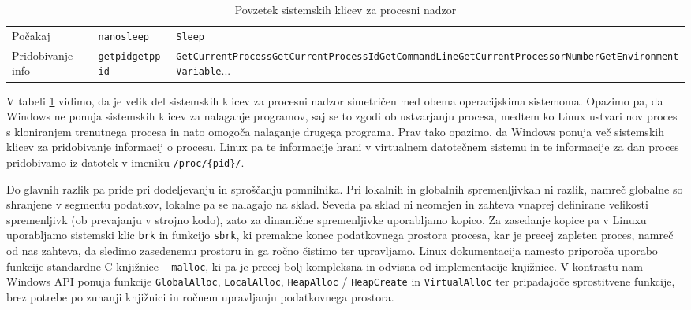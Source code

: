 \documentclass[a4paper,12pt,openright]{book}
\begin{document}
\begin{table}[h!]
\begin{center}
\begin{tabular}{ p{3.7cm}|p{2.5cm}|p{6cm} }
			Počakaj          & \verb|nanosleep|                                       & \verb|Sleep|                                                                                                                                                                    \\
			Pridobivanje info & \verb|getpid|\newline\verb|getppid|                    & \verb|GetCurrentProcess|\newline\verb|GetCurrentProcessId|\newline\verb|GetCommandLine|\newline\verb|GetCurrentProcessorNumber|\newline\verb|GetEnvironmentVariable|\newline... \\
		\end{tabular}
	\end{center}
	\caption{Povzetek sistemskih klicev za procesni nadzor}
	\label{tab:process_control}
\end{table}

V tabeli \ref{tab:process_control} vidimo, da je velik del sistemskih klicev za procesni nadzor simetričen med obema operacijskima sistemoma.
Opazimo pa, da Windows ne ponuja sistemskih klicev za nalaganje programov, saj se to zgodi ob ustvarjanju procesa, medtem ko Linux ustvari nov proces s kloniranjem trenutnega procesa in nato omogoča nalaganje drugega programa.
Prav tako opazimo, da Windows ponuja več sistemskih klicev za pridobivanje informacij o procesu, Linux pa te informacije hrani v virtualnem datotečnem sistemu in te informacije za dan proces pridobivamo iz datotek v imeniku \verb|/proc/{pid}/|.

Do glavnih razlik pa pride pri dodeljevanju in sproščanju pomnilnika. Pri lokalnih in globalnih spremenljivkah ni razlik, namreč globalne so shranjene v segmentu podatkov, lokalne pa se nalagajo na sklad.
Seveda pa sklad ni neomejen in zahteva vnaprej definirane velikosti spremenljivk (ob prevajanju v strojno kodo), zato za dinamične spremenljivke uporabljamo kopico.
Za zasedanje kopice pa v Linuxu uporabljamo sistemski klic \verb|brk| in funkcijo \verb|sbrk|, ki premakne konec podatkovnega prostora procesa, kar je precej zapleten proces, namreč od nas zahteva, da sledimo zasedenemu prostoru in ga ročno čistimo ter upravljamo. Linux dokumentacija namesto priporoča uporabo funkcije standardne C knjižnice -- \verb|malloc|, ki pa je precej bolj kompleksna in odvisna od implementacije knjižnice.
V kontrastu nam Windows API ponuja funkcije \verb|GlobalAlloc|, \verb|LocalAlloc|, \verb|HeapAlloc| / \verb|HeapCreate| in \verb|VirtualAlloc| ter pripadajoče sprostitvene funkcije, brez potrebe po zunanji knjižnici in ročnem upravljanju podatkovnega prostora.
\end{document}
